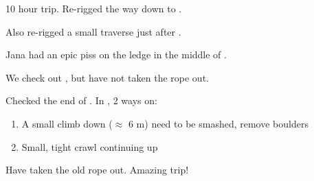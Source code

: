 
10 hour trip. 
Re-rigged the way down to . 

Also re-rigged a small traverse just after .

Jana had an epic piss on the ledge in the middle of . 


We check out , but have not taken the rope out.

Checked the end of . In , 2 ways on:

\begin{enumerate}
    \item 
    A small climb down ($\approx$ 6 m) need to be smashed, remove boulders
    \item 
    Small, tight crawl continuing up 
\end{enumerate}

Have taken the  old rope out. Amazing trip!
    




